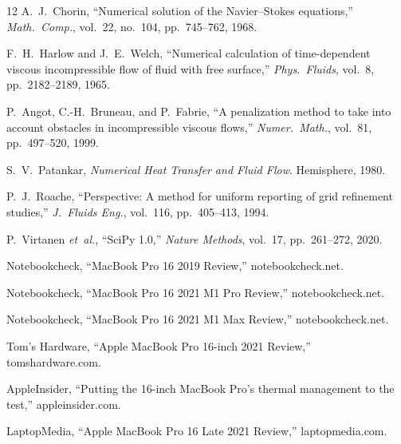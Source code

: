 \documentclass[10pt,twocolumn,letterpaper]{article}
\begin{document}
\begin{thebibliography}{12}
A.~J.~Chorin, ``Numerical solution of the Navier--Stokes
equations,'' \emph{Math.\ Comp.}, vol.~22, no.~104, pp.~745--762,
1968.

F.~H.~Harlow and J.~E.~Welch, ``Numerical calculation of
time-dependent viscous incompressible flow of fluid with free
surface,'' \emph{Phys.\ Fluids}, vol.~8, pp.~2182--2189, 1965.

P.~Angot, C.-H.~Bruneau, and P.~Fabrie, ``A penalization method
to take into account obstacles in incompressible viscous flows,''
\emph{Numer.\ Math.}, vol.~81, pp.~497--520, 1999.

S.~V.~Patankar, \emph{Numerical Heat Transfer and Fluid Flow}.
Hemisphere, 1980.

P.~J.~Roache, ``Perspective: A method for uniform reporting of
grid refinement studies,'' \emph{J.\ Fluids Eng.}, vol.~116,
pp.~405--413, 1994.

P.~Virtanen \emph{et~al.}, ``SciPy 1.0,'' \emph{Nature Methods},
vol.~17, pp.~261--272, 2020.

Notebookcheck, ``MacBook Pro 16 2019 Review,'' notebookcheck.net.

Notebookcheck, ``MacBook Pro 16 2021 M1 Pro Review,''
notebookcheck.net.

Notebookcheck, ``MacBook Pro 16 2021 M1 Max Review,''
notebookcheck.net.

Tom's Hardware, ``Apple MacBook Pro 16-inch 2021 Review,''
tomshardware.com.

AppleInsider, ``Putting the 16-inch MacBook Pro's thermal
management to the test,'' appleinsider.com.

LaptopMedia, ``Apple MacBook Pro 16 Late 2021 Review,''
laptopmedia.com.
\end{thebibliography}

\balance
\end{document}
